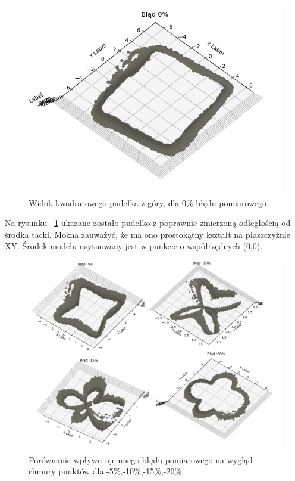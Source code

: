 \begin{figure}[H]
  \centering
  \includegraphics[scale=0.4]{blad_0.png}
  \caption{Widok kwadratowego pudełka z góry, dla 0\% błędu pomiarowego.}   
  \label{fig:zerobledu}
\end{figure}
Na rysunku ~\ref{fig:zerobledu} ukazane zostało pudełko z poprawnie zmierzoną odległością od środka tacki. Można zauważyć, że ma ono prostokątny kształt na płaszczyźnie XY. Środek modelu usytuowany jest w punkcie o współrzędnych (0,0). 
\begin{figure}[H]
  \centering
  \includegraphics[scale=0.4]{bledyujemne.png}
  \caption{Porównanie wpływu ujemnego błędu pomiarowego na wygląd chmury punktów dla -5\%,-10\%,-15\%,-20\%.}   
  \label{fig:ujemnebledy}
\end{figure}

